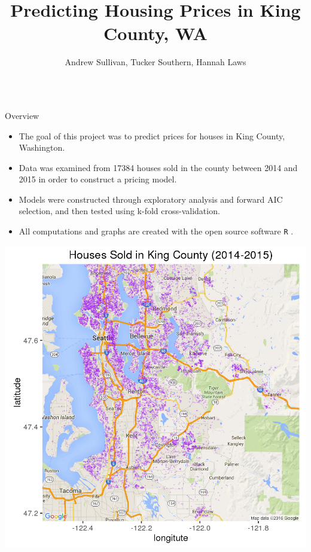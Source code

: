 \documentclass[final]{beamer}
\title{Predicting Housing Prices in King County, WA}
\author{Andrew Sullivan, Tucker Southern, Hannah Laws}
\institute{Department of Mathematical Sciences}
\begin{document}

\begin{frame}[fragile]
\vspace{-2ex}
\begin{columns}[t]


\begin{column}{0.31\linewidth}
\begin{minipage}[t][.955\textheight]{\linewidth} 
\vspace{0ex}
\begin{block}{Overview}
\begin{itemize}
\item The goal of this project was to predict prices for houses in King County, Washington.
\item Data was examined from 17384 houses sold in the county between 2014 and 2015 in order to construct a pricing model.
\item Models were constructed through exploratory analysis and forward AIC selection, and then tested using k-fold cross-validation.
\item All computations and graphs are created with the open source software \texttt{R} \cite{R-base}. 
\end{itemize}

\centering
\includegraphics{countymap.png}
\vspace{0ex}
\end{block}
\vfill


\end{minipage}
\end{column}
\end{columns}
\end{frame}
\end{document}
